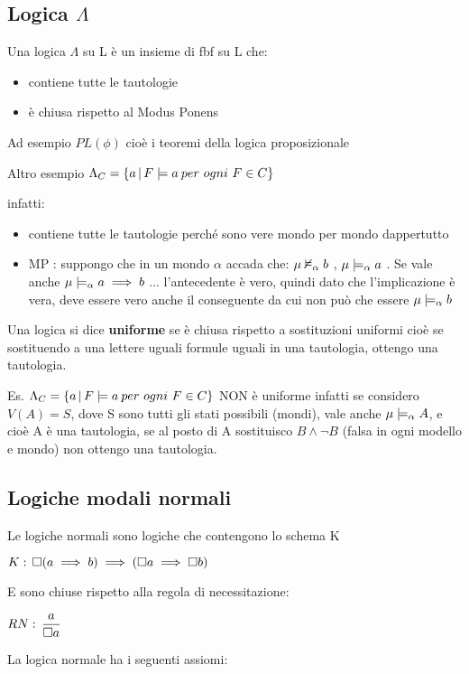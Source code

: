 \subsection{Logica $\Lambda$}

Una logica $\Lambda$ su L è un insieme di fbf su L che: 
\begin{itemize}
\item contiene tutte le tautologie 
\item è chiusa rispetto al Modus Ponens 
\end{itemize}
Ad esempio $PL(\phi)$ cioè i teoremi della logica proposizionale

Altro esempio $\Lambda_{C}=\{a\,|\,\vera F{a\: per}\ ogni\ F\in C\}$

infatti: 
\begin{itemize}
\item contiene tutte le tautologie perché sono vere mondo per mondo dappertutto 
\item MP : suppongo che in un mondo $\alpha$ accada che: $\mu\nvDash_{\alpha}b$
, $\mu\models_{\alpha}a$ . Se vale anche $\mu\models_{\alpha}a\implies b$
... l'antecedente è vero, quindi dato che l'implicazione è vera, deve
essere vero anche il conseguente da cui non può che essere $\mu\models_{\alpha}b$ 
\end{itemize}
Una logica si dice \textbf{uniforme }se è chiusa rispetto a sostituzioni
uniformi cioè se sostituendo a una lettere uguali formule uguali in
una tautologia, ottengo una tautologia.

Es. $\Lambda_{C}=\{a\,|\,\vera F{a\: per}\ ogni\ F\in C\}$ NON è
uniforme infatti se considero $V(A)=S$, dove S sono tutti gli stati
possibili (mondi), vale anche $\mu\models_{\alpha}A$, e cioè A è
una tautologia, se al posto di A sostituisco $B\wedge\neg B$ (falsa
in ogni modello e mondo) non ottengo una tautologia.


\subsection{Logiche modali normali}

Le logiche normali sono logiche che contengono lo schema K

$K:\,\square(a\implies b)\implies(\square a\implies\square b)$

E sono chiuse rispetto alla regola di necessitazione:

$RN:\,\dfrac{a}{\square a}$

La logica normale ha i seguenti assiomi:

